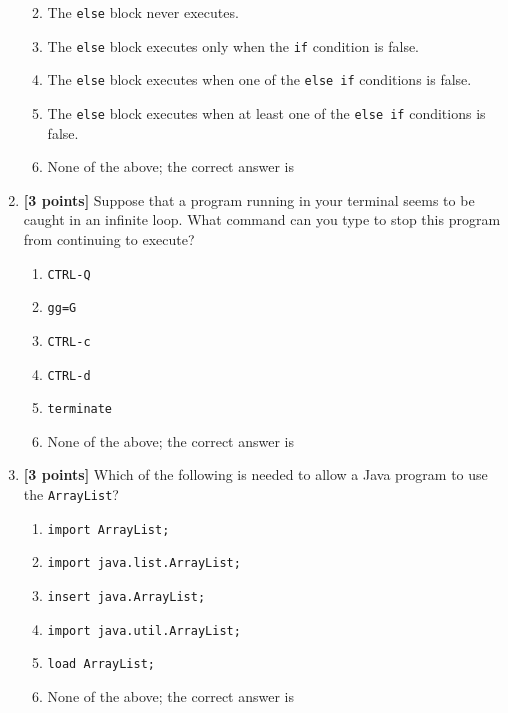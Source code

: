 \begin{enumerate}
\begin{enumerate}
\medskip
\item The {\tt else} block never executes.

\medskip
\item The {\tt else} block executes only when the {\tt if} condition is false.

\medskip 
\item The {\tt else} block executes when one of the {\tt else if} conditions is false.

\medskip 
\item The {\tt else} block executes when at least one of the {\tt else if} conditions is false.

\medskip
\item None of the above; the correct answer is \underline{\hspace{3in}}
\end{enumerate}


\bigskip
\bigskip
\bigskip
\bigskip

\item {\bf [3 points]}
  Suppose that a program running in your terminal seems to be caught in an infinite loop. What command can you
  type to stop this program from continuing to execute?
  \begin{enumerate}
    \item {\tt CTRL-Q}
      \medskip 
    \item {\tt gg=G}
      \medskip
    \item {\tt CTRL-c}
      \medskip 
    \item {\tt CTRL-d}
      \medskip
    \item {\tt terminate}
      \medskip
\item None of the above; the correct answer is \underline{\hspace{3in}}
  \end{enumerate}

\bigskip
\bigskip
\bigskip

\item {\bf [3 points]}
  Which of the following is needed to allow a Java program to use the {\tt ArrayList}?
  \begin{enumerate}
    \item {\tt import ArrayList;}
      \medskip 
    \item {\tt import java.list.ArrayList;}
      \medskip 
    \item {\tt insert java.ArrayList;}
      \medskip
    \item {\tt import java.util.ArrayList;}
      \medskip
    \item {\tt load ArrayList;}
      \medskip
    \item None of the above; the correct answer is \underline{\hspace{3in}}
  \end{enumerate}


\end{enumerate}
